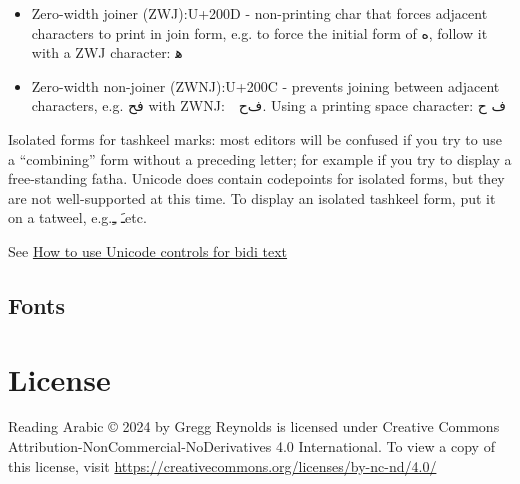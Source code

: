 \documentclass[11pt]{article}
\begin{document}
\begin{itemize}
\item Zero-width joiner (ZWJ):\quad U+200D - non-printing char that forces
  adjacent characters to print in join form, e.g. to force the initial
  form of \textarabic{ه}, follow it with a ZWJ character:\quad
  \textarabic{ه‍}
\item Zero-width non-joiner (ZWNJ):\quad U+200C - prevents joining
  between adjacent characters, e.g. \textarabic{فح} with ZWNJ:\ \ 
  \textarabic{ف‌ح}. Using a printing space character: \textarabic{ف ح}
\end{itemize}

\vspace{8pt}
\noindent Isolated forms for tashkeel marks: most editors will be
confused if you try to use a “combining” form without a preceding
letter; for example if you try to display a free-standing fatha.
Unicode does contain codepoints for isolated forms, but they are not
well-supported at this time. To display an isolated tashkeel form, put
it on a tatweel, e.g.\quad\textarabic{ـَ} \quad\textarabic{ـِ}\quad etc.

See \href{https://www.w3.org/International/questions/qa-bidi-unicode-controls}{How to use Unicode controls for bidi text}

\subsection{Fonts}



\appendix

\section{License}

Reading Arabic © 2024 by Gregg Reynolds is licensed under Creative
Commons Attribution-NonCommercial-NoDerivatives 4.0 International. To
view a copy of this license, visit
\href{https://creativecommons.org/licenses/by-nc-nd/4.0/}{https://creativecommons.org/licenses/by-nc-nd/4.0/}
\end{document}
